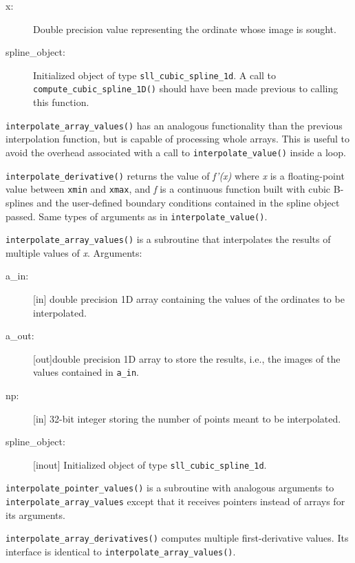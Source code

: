 \documentclass[]{report}   %
\begin{document}
\begin{description}
	\begin{description}
		\item[ x:] Double precision value representing the ordinate whose image is sought.
		\item[ spline\_object: ] Initialized object of type \verb+sll_cubic_spline_1d+. A call to \verb+compute_cubic_spline_1D()+ should have been made previous to calling this function.
	\end{description}

	\item \verb+interpolate_array_values()+ has an analogous functionality than the previous interpolation function, but is capable of processing whole arrays. This is useful to avoid the overhead associated with a call to \verb+interpolate_value()+ inside a loop.
	
	
	\item \verb+interpolate_derivative()+ returns the value of \emph{f'(x)} where \emph{x} is a floating-point value between \verb+xmin+ and \verb+xmax+, and \emph{f} is a continuous function built with cubic B-splines and the user-defined boundary conditions contained in the spline object passed. Same types of arguments as in \verb+interpolate_value()+.
	
	\item \verb+interpolate_array_values()+ is a subroutine that interpolates the results of multiple values of \emph{x}. Arguments:
		\begin{description}
			\item[a\_in:] [in] double precision 1D array containing the values of the ordinates to be interpolated.
			\item[a\_out:] [out]double precision 1D array to store the results, i.e., the images of the values contained in \verb+a_in+.
			\item[np:] [in] 32-bit integer storing the number of points meant to be interpolated.
			\item[ spline\_object: ] [inout] Initialized object of type \verb+sll_cubic_spline_1d+.
		\end{description}

	\item \verb+interpolate_pointer_values()+ is a subroutine with analogous arguments to \verb+interpolate_array_values+ except that it receives pointers instead of arrays for its arguments.
	
	\item \verb+interpolate_array_derivatives()+ computes multiple first-derivative values. Its interface is identical to \verb+interpolate_array_values()+.
	

\end{description}
\end{document}
